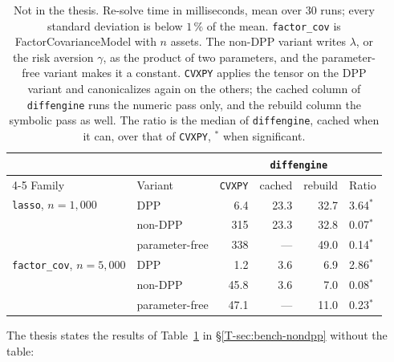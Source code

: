 \documentclass[letterpaper,12pt]{article}
\newcommand{\ac}[1]{#1}
\newcommand{\tsec}[1]{\S\ref{T-#1}}
\begin{document}
\begin{table}[htbp]
\centering
\caption{Not in the thesis. Re-solve time in milliseconds, mean over $30$ runs; every standard deviation is
below $1\,\%$ of the mean. \texttt{factor\_cov} is FactorCovarianceModel with $n$ assets. The
non-DPP variant writes $\lambda$, or the risk aversion $\gamma$, as the product of two
parameters, and the parameter-free variant makes it a constant. \texttt{CVXPY} applies the
tensor on the DPP variant and canonicalizes again on the others; the cached column of
\texttt{diffengine} runs the numeric pass only, and the rebuild column the symbolic pass as
well. The ratio is the median of \texttt{diffengine}, cached when it can, over that of
\texttt{CVXPY}, $^{*}$ when significant.}\label{tab:res-nondpp}
{\small
\begin{tabular}{l l r rr l}
\toprule
& & & \multicolumn{2}{c}{\texttt{diffengine}} & \\
\cmidrule(lr){4-5}
Family & Variant & \texttt{CVXPY} & cached & rebuild & Ratio \\
\midrule
\texttt{lasso}, $n = 1{,}000$         & \ac{DPP}        & 6.4 & 23.3 & 32.7 & 3.64$^{*}$ \\
                                   & non-\ac{DPP}    & 315 & 23.3 & 32.8 & 0.07$^{*}$ \\
                                   & parameter-free  & 338 & --- & 49.0 & 0.14$^{*}$ \\
\addlinespace
\texttt{factor\_cov}, $n = 5{,}000$   & \ac{DPP}        & 1.2 & 3.6 & 6.9 & 2.86$^{*}$ \\
                                   & non-\ac{DPP}    & 45.8 & 3.6 & 7.0 & 0.08$^{*}$ \\
                                   & parameter-free  & 47.1 & --- & 11.0 & 0.23$^{*}$ \\
\bottomrule
\end{tabular}}
\end{table}

The thesis states the results of Table~\ref{tab:res-nondpp} in \tsec{sec:bench-nondpp} without
the table:
\end{document}
